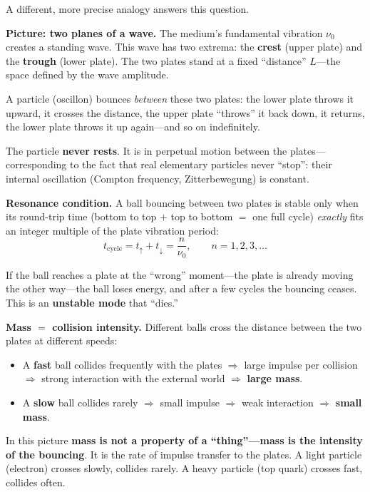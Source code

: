 \documentclass[11pt]{article}
\begin{document}
A different, more precise analogy answers this question.

\medskip
\textbf{Picture: two planes of a wave.}
The medium's fundamental vibration $\nu_0$ creates a standing wave.
This wave has two extrema: the \textbf{crest} (upper plate) and the
\textbf{trough} (lower plate). The two plates stand at a fixed
``distance'' $L$---the space defined by the wave amplitude.

A particle (oscillon) bounces \emph{between} these two plates: the
lower plate throws it upward, it crosses the distance, the upper
plate ``throws'' it back down, it returns, the lower plate throws
it up again---and so on indefinitely.

The particle \textbf{never rests}. It is in perpetual motion between
the plates---corresponding to the fact that real elementary
particles never ``stop'': their internal oscillation (Compton
frequency, Zitterbewegung) is constant.

\medskip
\textbf{Resonance condition.}
A ball bouncing between two plates is stable only when its
round-trip time (bottom to top $+$ top to bottom $=$ one full
cycle) \emph{exactly} fits an integer multiple of the plate
vibration period:
\begin{equation}
  t_{\mathrm{cycle}} = t_{\uparrow} + t_{\downarrow}
  = \frac{n}{\nu_0},
  \qquad n = 1, 2, 3, \ldots
  \label{eq:flight_time}
\end{equation}

If the ball reaches a plate at the ``wrong'' moment---the plate is
already moving the other way---the ball loses energy, and after a
few cycles the bouncing ceases. This is an \textbf{unstable mode}
that ``dies.''

\medskip
\textbf{Mass $=$ collision intensity.}
Different balls cross the distance between the two plates at
different speeds:
\begin{itemize}
  \item A \textbf{fast} ball collides frequently with the plates
    $\Rightarrow$ large impulse per collision $\Rightarrow$ strong
    interaction with the external world $\Rightarrow$
    \textbf{large mass}.
  \item A \textbf{slow} ball collides rarely $\Rightarrow$ small
    impulse $\Rightarrow$ weak interaction $\Rightarrow$
    \textbf{small mass}.
\end{itemize}
In this picture \textbf{mass is not a property of a ``thing''---mass
is the intensity of the bouncing}. It is the rate of impulse
transfer to the plates. A light particle (electron) crosses slowly,
collides rarely. A heavy particle (top quark) crosses fast, collides
often.
\end{document}

